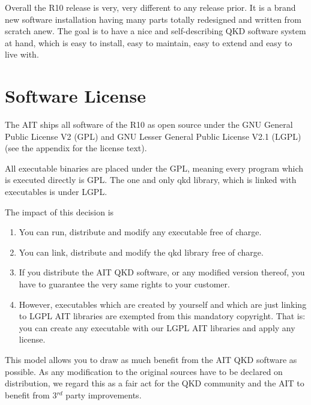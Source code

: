 Overall the R10 release is very, very different to any release prior. It is a brand new software installation having many parts totally redesigned and written from scratch anew. The goal is to have a nice and self-describing QKD software system at hand, which is easy to install, easy to maintain, easy to extend and easy to live with.


\section{Software License}
\label{sec:Software License}

The AIT ships all software of the R10 as open source under the GNU General Public License V2 (GPL) and GNU Lesser General Public License V2.1 (LGPL) (see the appendix for the license text).

\medskip

All executable binaries are placed under the GPL, meaning every program which is executed directly is GPL. The one and only qkd library, which is linked with executables is under LGPL.

\medskip

The impact of this decision is

\begin{enumerate}

    \item You can run, distribute and modify any executable free of charge.

    \item You can link, distribute and modify the qkd library free of charge.

    \item If you distribute the AIT QKD software, or any modified version thereof, you have to guarantee the very same rights to your customer.

    \item However, executables which are created by yourself and which are just linking to LGPL AIT libraries are exempted from this mandatory copyright. That is: you can create any executable with our LGPL AIT libraries and apply any license.

\end{enumerate}

This model allows you to draw as much benefit from the AIT QKD software as possible. As any modification to the original sources have to be declared on distribution, we regard this as a fair act for the QKD community and the AIT to benefit from 3$^{rd}$ party improvements.


